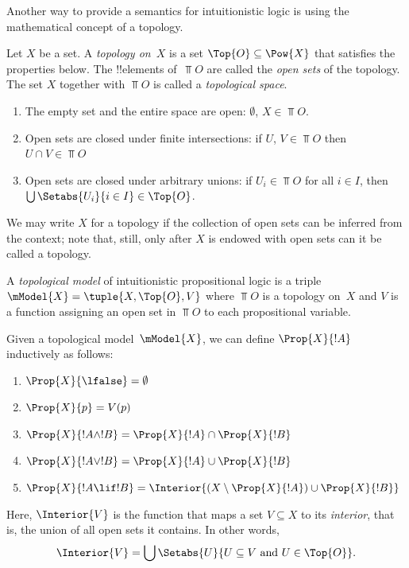 \documentclass[../../../include/open-logic-section]{subfiles}
\begin{document}


Another way to provide a semantics for intuitionistic logic is using
the mathematical concept of a topology.

\begin{defn}
  Let $X$ be a set. A \emph{topology on~$X$} is a set $\Top{O}
  \subseteq \Pow{X}$ that satisfies the properties below. The
  !!{element}s of~$\Top{O}$ are called the \emph{open sets} of the
  topology. The set $X$ together with $\Top{O}$ is called a
  \emph{topological space}.
  \begin{enumerate}
  \item The empty set and the entire space are open: $\emptyset$, $X \in
    \Top{O}$.
  \item Open sets are closed under finite intersections: if $U$, $V \in
    \Top{O}$ then $U \cap V \in \Top{O}$
  \item Open sets are closed under arbitrary unions: if $U_i \in
    \Top{O}$ for all $i \in I$, then $\bigcup \Setabs{U_i}{i \in
      I} \in \Top{O}$.
  \end{enumerate}
\end{defn}

We may write $X$ for a topology if the collection of open sets can be
inferred from the context; note that, still, only after $X$ is endowed
with open sets can it be called a topology.

\begin{defn}
  A \emph{topological model} of intuitionistic propositional logic is
  a triple $\mModel{X} = \tuple{X, \Top{O}, V}$ where $\Top{O}$ is a
  topology on~$X$ and $V$ is a function assigning an open set in
  $\Top{O}$ to each propositional variable.

  Given a topological model~$\mModel{X}$, we can define $\Prop{X}{!A}$
  inductively as follows:
  \begin{enumerate}
  \item $\Prop{X}{\lfalse} = \emptyset$
  \item $\Prop{X}{p} = V(p)$
  \item $\Prop{X}{!A \land !B} = \Prop{X}{!A} \cap \Prop{X}{!B}$
  \item $\Prop{X}{!A \lor !B} = \Prop{X}{!A} \cup \Prop{X}{!B}$
  \item $\Prop{X}{!A \lif !B} = \Interior{(X \setminus \Prop{X}{!A}) \cup
    \Prop{X}{!B}}$
  \end{enumerate}
  Here, $\Interior{V}$ is the function that maps a set $V \subseteq X$
  to its \emph{interior}, that is, the union of all open sets it
  contains. In other words,
  \[
  \Interior{V} = \bigcup \Setabs{U}{U \subseteq V \text{ and } U \in \Top{O}}.
  \]
\end{defn}
\end{document}
